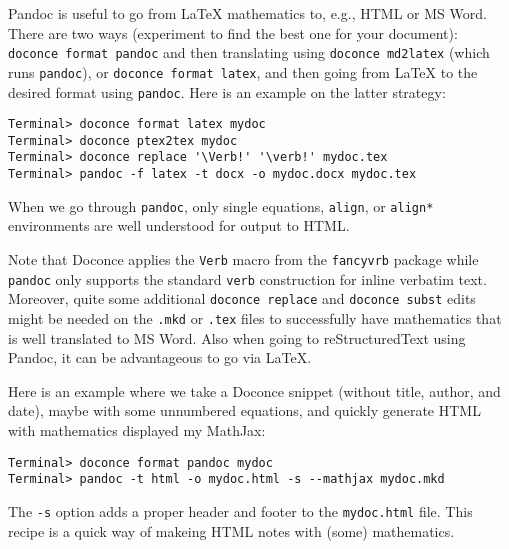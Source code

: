\documentclass[%
oneside,                 %
final,                   %
10pt]{article}
\begin{document}
Pandoc is useful to go from {\LaTeX} mathematics to, e.g., HTML or MS
Word.  There are two ways (experiment to find the best one for your
document): {\fontsize{10pt}{10pt}\Verb!doconce format pandoc!} and then translating using {\fontsize{10pt}{10pt}\Verb!doconce md2latex!} (which runs {\fontsize{10pt}{10pt}\Verb!pandoc!}), or {\fontsize{10pt}{10pt}\Verb!doconce format latex!}, and then
going from {\LaTeX} to the desired format using {\fontsize{10pt}{10pt}\Verb!pandoc!}.
Here is an example on the latter strategy:
\vspace{4pt}
\begin{Verbatim}[numbers=none,frame=lines,label=\fbox{{\tiny Terminal}},fontsize=\fontsize{9pt}{9pt},
labelposition=topline,framesep=2.5mm,framerule=0.7pt]
Terminal> doconce format latex mydoc
Terminal> doconce ptex2tex mydoc
Terminal> doconce replace '\Verb!' '\verb!' mydoc.tex
Terminal> pandoc -f latex -t docx -o mydoc.docx mydoc.tex
\end{Verbatim}
When we go through {\fontsize{10pt}{10pt}\Verb!pandoc!}, only single equations, {\fontsize{10pt}{10pt}\Verb!align!}, or {\fontsize{10pt}{10pt}\Verb!align*!}
environments are well understood for output to HTML.

Note that Doconce applies the {\fontsize{10pt}{10pt}\Verb!Verb!} macro from the {\fontsize{10pt}{10pt}\Verb!fancyvrb!} package
while {\fontsize{10pt}{10pt}\Verb!pandoc!} only supports the standard {\fontsize{10pt}{10pt}\Verb!verb!} construction for
inline verbatim text.  Moreover, quite some additional {\fontsize{10pt}{10pt}\Verb!doconce replace!} and {\fontsize{10pt}{10pt}\Verb!doconce subst!} edits might be needed on the {\fontsize{10pt}{10pt}\Verb!.mkd!} or
{\fontsize{10pt}{10pt}\Verb!.tex!} files to successfully have mathematics that is well translated
to MS Word.  Also when going to reStructuredText using Pandoc, it can
be advantageous to go via {\LaTeX}.

Here is an example where we take a Doconce snippet (without title, author,
and date), maybe with some unnumbered equations, and quickly generate
HTML with mathematics displayed my MathJax:
\vspace{4pt}
\begin{Verbatim}[numbers=none,frame=lines,label=\fbox{{\tiny Terminal}},fontsize=\fontsize{9pt}{9pt},
labelposition=topline,framesep=2.5mm,framerule=0.7pt]
Terminal> doconce format pandoc mydoc
Terminal> pandoc -t html -o mydoc.html -s --mathjax mydoc.mkd
\end{Verbatim}
The {\fontsize{10pt}{10pt}\Verb!-s!} option adds a proper header and footer to the {\fontsize{10pt}{10pt}\Verb!mydoc.html!} file.
This recipe is a quick way of makeing HTML notes with (some) mathematics.
\end{document}

